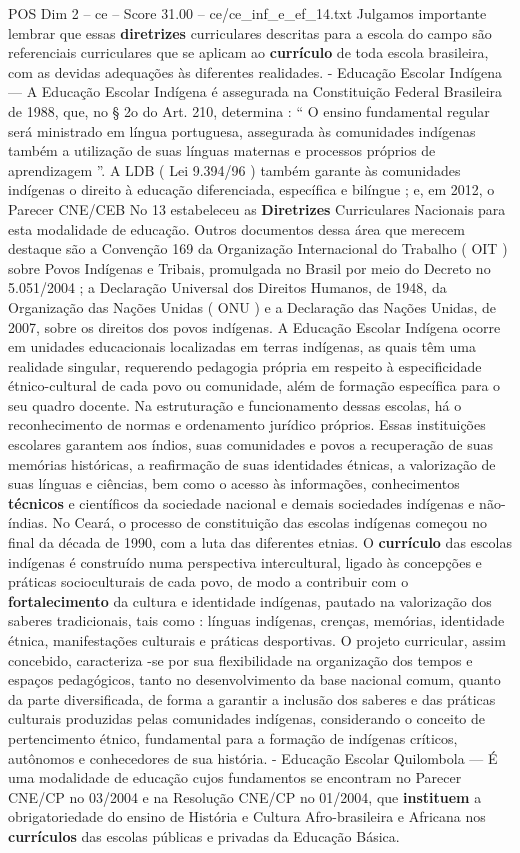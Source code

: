 \begin{textsample}{POS Dim 2 – ce – Score 31.00 – ce/ce\_inf\_e\_ef\_14.txt}
Julgamos importante lembrar que essas \textbf{diretrizes} curriculares descritas para a escola do campo são referenciais curriculares que se aplicam ao \textbf{currículo} de toda escola brasileira, com as devidas adequações às diferentes realidades. - Educação Escolar Indígena — A Educação Escolar Indígena é assegurada na Constituição Federal Brasileira de 1988, que, no § 2o do Art. 210, determina : “ O ensino fundamental regular será ministrado em língua portuguesa, assegurada às comunidades indígenas também a utilização de suas línguas maternas e processos próprios de aprendizagem ”.
A LDB ( Lei 9.394/96 ) também garante às comunidades indígenas o direito à educação diferenciada, específica e bilíngue ; e, em 2012, o Parecer CNE/CEB No 13 estabeleceu as \textbf{Diretrizes} Curriculares Nacionais para esta modalidade de educação.
Outros documentos dessa área que merecem destaque são a Convenção 169 da Organização Internacional do Trabalho ( OIT ) sobre Povos Indígenas e Tribais, promulgada no Brasil por meio do Decreto no 5.051/2004 ; a Declaração Universal dos Direitos Humanos, de 1948, da Organização das Nações Unidas ( ONU ) e a Declaração das Nações Unidas, de 2007, sobre os direitos dos povos indígenas.
A Educação Escolar Indígena ocorre em unidades educacionais localizadas em terras indígenas, as quais têm uma realidade singular, requerendo pedagogia própria em respeito à especificidade étnico-cultural de cada povo ou comunidade, além de formação específica para o seu quadro docente.
Na estruturação e funcionamento dessas escolas, há o reconhecimento de normas e ordenamento jurídico próprios.
Essas instituições escolares garantem aos índios, suas comunidades e povos a recuperação de suas memórias históricas, a reafirmação de suas identidades étnicas, a valorização de suas línguas e ciências, bem como o acesso às informações, conhecimentos \textbf{técnicos} e científicos da sociedade nacional e demais sociedades indígenas e não-índias.
No Ceará, o processo de constituição das escolas indígenas começou no final da década de 1990, com a luta das diferentes etnias.
O \textbf{currículo} das escolas indígenas é construído numa perspectiva intercultural, ligado às concepções e práticas socioculturais de cada povo, de modo a contribuir com o \textbf{fortalecimento} da cultura e identidade indígenas, pautado na valorização dos saberes tradicionais, tais como : línguas indígenas, crenças, memórias, identidade étnica, manifestações culturais e práticas desportivas.
O projeto curricular, assim concebido, caracteriza -se por sua flexibilidade na organização dos tempos e espaços pedagógicos, tanto no desenvolvimento da base nacional comum, quanto da parte diversificada, de forma a garantir a inclusão dos saberes e das práticas culturais produzidas pelas comunidades indígenas, considerando o conceito de pertencimento étnico, fundamental para a formação de indígenas críticos, autônomos e conhecedores de sua história. - Educação Escolar Quilombola — É uma modalidade de educação cujos fundamentos se encontram no Parecer CNE/CP no 03/2004 e na Resolução CNE/CP no 01/2004, que \textbf{instituem} a obrigatoriedade do ensino de História e Cultura Afro-brasileira e Africana nos \textbf{currículos} das escolas públicas e privadas da Educação Básica.

\end{textsample}
